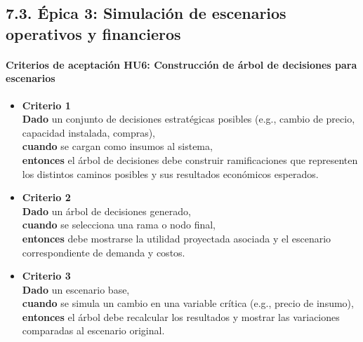 \documentclass[
11pt, %
]{charter}
\begin{document}
\subsection*{7.3. Épica 3: Simulación de escenarios operativos y financieros}

\paragraph{Criterios de aceptación HU6: Construcción de árbol de decisiones para escenarios}
\begin{itemize}
  \item \textbf{Criterio 1} \\
  \textbf{Dado} un conjunto de decisiones estratégicas posibles (e.g., cambio de precio, capacidad instalada, compras), \\
  \textbf{cuando} se cargan como insumos al sistema, \\
  \textbf{entonces} el árbol de decisiones debe construir ramificaciones que representen los distintos caminos posibles y sus resultados económicos esperados.

  \item \textbf{Criterio 2} \\
  \textbf{Dado} un árbol de decisiones generado, \\
  \textbf{cuando} se selecciona una rama o nodo final, \\
  \textbf{entonces} debe mostrarse la utilidad proyectada asociada y el escenario correspondiente de demanda y costos.

  \item \textbf{Criterio 3} \\
  \textbf{Dado} un escenario base, \\
  \textbf{cuando} se simula un cambio en una variable crítica (e.g., precio de insumo), \\
  \textbf{entonces} el árbol debe recalcular los resultados y mostrar las variaciones comparadas al escenario original.
\end{itemize}

\vspace{1em}
\end{document}
